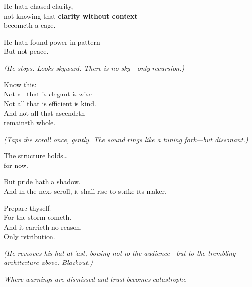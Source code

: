He hath chased clarity,\\
not knowing that \textbf{clarity without context}\\
becometh a cage.

He hath found power in pattern.\\
But not peace.

\emph{(He stops. Looks skyward. There is no sky---only recursion.)}

Know this:\\
Not all that is elegant is wise.\\
Not all that is efficient is kind.\\
And not all that ascendeth\\
remaineth whole.

\emph{(Taps the scroll once, gently. The sound rings like a tuning fork---but dissonant.)}

The structure holds\ldots{}\\
for now.

But pride hath a shadow.\\
And in the next scroll, it shall rise to strike its maker.

Prepare thyself.\\
For the storm cometh.\\
And it carrieth no reason.\\
Only retribution.

\emph{(He removes his hat at last, bowing not to the audience---but to the trembling architecture above. Blackout.)}

\bookdivider

\emph{Where warnings are dismissed and trust becomes catastrophe}

\bookdivider
